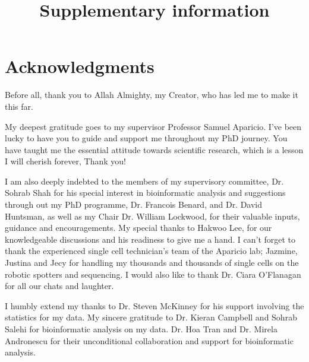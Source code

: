 

\makeatletter
\newcommand{\putFigLargCap}[5]
{
\begin{center}
\texttt{[image: \#1]}   
\bigskip
\setbox0\vbox{
\let\caption@rule\relax
\captionof{figure}[#5]{\textbf{#5} #3 \label{#4}}
\global\skip1\lastskip\unskip
\global\setbox1\lastbox

}
\unvbox0
\setbox0\hbox{\unhbox1\unskip\unskip\unpenalty
\global\setbox1\lastbox}
\unvbox1
\vskip\skip1
\end{center}
}
\makeatother





\title{Supplementary information}















\chapter{Acknowledgments}

Before all, thank you to Allah Almighty, my Creator, who has led me to make it this far.

My deepest gratitude goes to my supervisor Professor Samuel Aparicio. I've been lucky to have you to guide and support me throughout my PhD journey. You have taught me the essential attitude towards scientific research, which is a lesson I will cherish forever, Thank you!

I am also deeply indebted to the members of my supervisory committee, Dr. Sohrab Shah for his special interest in bioinformatic analysis and suggestions through out my PhD programme, Dr. Francois Benard, and Dr. David Huntsman, as well as my Chair Dr. William Lockwood, for their valuable inputs, guidance and encouragements. My special thanks to Hakwoo Lee, for our knowledgeable discussions and his readiness to give me a hand. I can't forget to thank the experienced single cell technician's team of the Aparicio lab; Jazmine, Justina and Jecy for handling my thousands and thousands of single cells on the robotic spotters and sequencing. I would also like to thank Dr. Ciara O'Flanagan for all our chats and laughter. 

I humbly extend my thanks to Dr. Steven McKinney for his support involving the statistics for my data. My sincere gratitude to Dr. Kieran Campbell and Sohrab Salehi for bioinformatic analysis on my data. Dr. Hoa Tran and Dr. Mirela Andronescu for their unconditional collaboration and support for bioinformatic analysis. 

